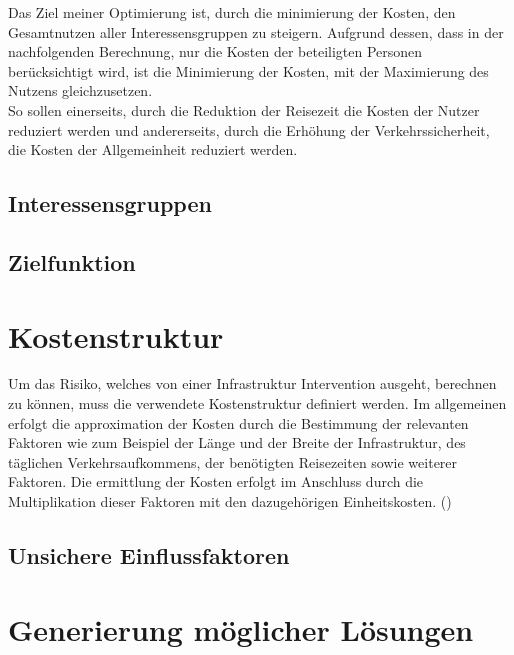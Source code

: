 Das Ziel meiner Optimierung ist, durch die minimierung der Kosten, den Gesamtnutzen aller Interessensgruppen zu steigern. Aufgrund dessen, dass in der nachfolgenden Berechnung, nur die Kosten der beteiligten Personen berücksichtigt wird, ist die Minimierung der Kosten, mit der Maximierung des Nutzens gleichzusetzen. \\
So sollen einerseits, durch die Reduktion der Reisezeit die Kosten der Nutzer reduziert werden und andererseits, durch die Erhöhung der Verkehrssicherheit, die Kosten der Allgemeinheit reduziert werden. 



	\subsection{Interessensgruppen}
	

	\subsection{Zielfunktion}
	
	
\pagebreak

\section{Kostenstruktur}
\label{sec:Kostenstruktur}

Um das Risiko, welches von einer Infrastruktur Intervention ausgeht, berechnen zu können, muss die verwendete Kostenstruktur definiert werden. 
Im allgemeinen erfolgt die approximation der Kosten durch die Bestimmung der relevanten Faktoren wie zum Beispiel der Länge und der Breite der Infrastruktur, des täglichen Verkehrsaufkommens, der benötigten Reisezeiten sowie weiterer Faktoren. Die ermittlung der Kosten erfolgt im Anschluss durch die Multiplikation dieser Faktoren mit den dazugehörigen Einheitskosten. (\cite{Adey2012}) 


	
	
	\subsection{Unsichere Einflussfaktoren}
	\label{subsec:Uncertain}
	



\section{Generierung möglicher Lösungen}
\label{sec:Varianten}


